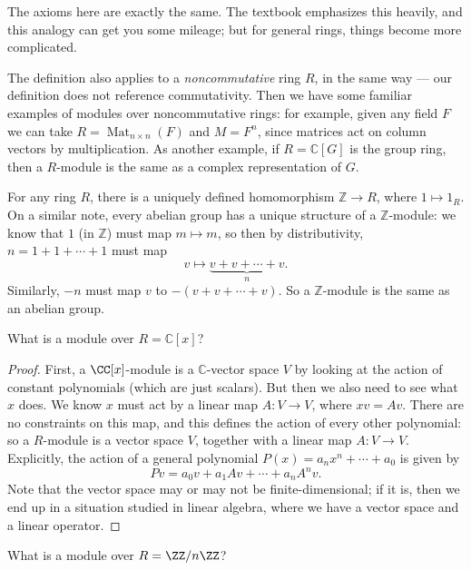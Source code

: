 The axioms here are exactly the same. The textbook emphasizes this heavily, and this analogy can get you some mileage; but for general rings, things become more complicated. 

\begin{note}
    The definition also applies to a \emph{noncommutative} ring $R$, in the same way --- our definition does not reference commutativity. Then we have some familiar examples of modules over noncommutative rings: for example, given any field $F$ we can take $R = \operatorname{Mat}_{n \times n}(F)$ and $M = F^n$, since matrices act on column vectors by multiplication. As another example, if $R = \mathbb{C}[G]$ is the group ring, then a $R$-module is the same as a complex representation of $G$. 
\end{note}

For any ring $R$, there is a uniquely defined homomorphism $\mathbb{Z} \to R$, where $1 \mapsto 1_R$. On a similar note, every abelian group has a unique structure of a $\mathbb{Z}$-module: we know that $1$ (in $\mathbb{Z}$) must map $m \mapsto m$, so then by distributivity, $n = 1 + 1 + \cdots + 1$ must map \[v \mapsto \underbrace{v + v + \cdots + v}_n.\] Similarly, $-n$ must map $v$ to $-(v + v + \cdots + v)$. So a $\mathbb{Z}$-module is the same as an abelian group. 

\begin{example}
    What is a module over $R = \mathbb{C}[x]$?
\end{example}

\begin{proof}
    First, a $\CC[x]$-module is a $\mathbb{C}$-vector space $V$ by looking at the action of constant polynomials (which are just scalars). But then we also need to see what $x$ does. We know $x$ must act by a linear map $A : V \to V$, where $xv = Av$. There are no constraints on this map, and this defines the action of every other polynomial: so a $R$-module is a vector space $V$, together with a linear map $A : V \to V$. Explicitly, the action of a general polynomial $P(x) = a_nx^n + \cdots + a_0$ is given by \[Pv = a_0v + a_1Av + \cdots + a_nA^nv.\]  Note that the vector space may or may not be finite-dimensional; if it is, then we end up in a situation studied in linear algebra, where we have a vector space and a linear operator.
\end{proof}

\begin{example}
    What is a module over $R = \ZZ/n\ZZ$?
\end{example}

